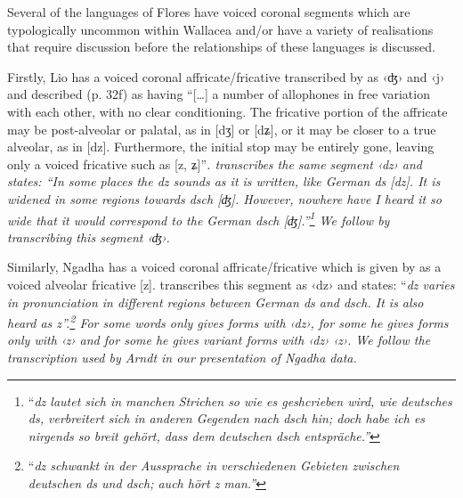 Several of the languages of Flores have voiced coronal segments
which are typologically uncommon within Wallacea and/or have
a variety of realisations that require discussion before the
relationships of these languages is discussed.

Firstly, Lio has a voiced coronal affricate/fricative transcribed
by \citet{Elias2018} as ‹ʤ›
and ‹j› and described (p.
32f) as having “[{\ldots}] a number of allophones in free variation
with each other, with no clear conditioning.
The fricative portion of the affricate may be post-alveolar or
palatal, as in [dʒ] or [dʑ],
or it may be closer to a true alveolar, as in [dz].
Furthermore, the initial stop may be entirely gone,
leaving only a voiced fricative such as [z,
ʑ]”\it{.} \citet[6]{Arndt1933} transcribes the same segment ‹dz›
and states: “In some places the \it{dz} sounds as it is written,
like German \it{ds} [dz].
It is widened in some regions towards \it{dsch} [ʤ].
However, nowhere have I heard it so wide that it would correspond
to the German \it{dsch} [ʤ].”\footnote{
		“\it{dz} lautet sich in
		manchen Strichen so wie es geshcrieben wird,
		wie deutsches \it{ds}, verbreitert sich in anderen Gegenden nach
		\it{dsch} hin; doch habe ich es nirgends so breit gehört,
		dass dem deutschen \it{dsch} entspräche.”}
We follow \citet{Elias2018}
by transcribing this segment  ‹ʤ›.

Similarly, Ngadha has a voiced coronal affricate/fricative which
is given by \citet[114]{Djawanai1983} as a voiced alveolar fricative [z].
\citet[9]{Arndt1961} transcribes this segment as ‹dz›
and states: “\it{dz} varies in pronunciation in different regions
between German \it{ds} and \it{dsch}.
It is also heard as \it{z}”.\footnote{
		“\it{dz} schwankt in der
		Aussprache in verschiedenen Gebieten zwischen deutschen \it{ds}
		und \it{dsch}; auch hört \it{z} man.”}
For some words \citet{Arndt1961}
only gives forms with ‹dz›,
for some he gives forms only with ‹z›
and for some he gives variant forms with ‹dz› {\tl} ‹z›.
We follow the transcription used by Arndt in our presentation of Ngadha data.

